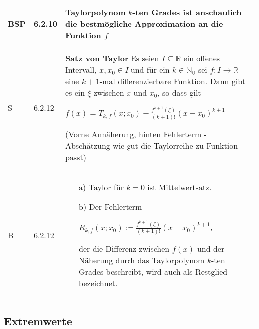 \begin{longtable}{p{0.75cm} p{1cm} p{16cm}}
        \midrule
        BSP & 6.2.10&   Taylorpolynom $k$-ten Grades ist anschaulich die bestmögliche Approximation an die Funktion $f$ \\
        \midrule
        S   & 6.2.12&   \textbf{Satz von Taylor} \hfill \break
                        Es seien $I \subseteq \mathbb{R}$ ein offenes Intervall, $x,x_0 \in I$ und für ein $k \in \mathbb{N_0}$ sei $f:I \rightarrow \mathbb{R}$
                        eine $k+1$-mal differenzierbare Funktion. Dann gibt es ein $\xi$ zwischen $x$ und $x_0$, so dass gilt \hfill \break
                        \centerline{$ f(x) = T_{k,f}(x;x_0) + \frac{f^{k+1}(\xi)}{(k+1)!} (x-x_0)^{k+1} $} 
                        (Vorne Annäherung, hinten Fehlerterm - Abschätzung wie gut die Taylorreihe zu Funktion passt) \\
        \midrule
        B   & 6.2.12&   \begin{itemize}[topsep=-0.5cm]
                            \item[a)] Taylor für $k=0$ ist Mittelwertsatz.
                            \item[b)] Der Fehlerterm \hfill \break
                                        \centerline{$ R_{k,f}(x;x_0) := \frac{f^{k+1}(\xi)}{(k+1)!}(x-x_0)^{k+1}$,}
                                        der die Differenz zwischen $f(x)$ und der Näherung durch das Taylorpolynom $k$-ten Grades beschreibt,
                                        wird auch als Restglied bezeichnet.
                        \end{itemize} \vspace{-0cm} \\

        \bottomrule

    \end{longtable}

\subsection{Extremwerte}

